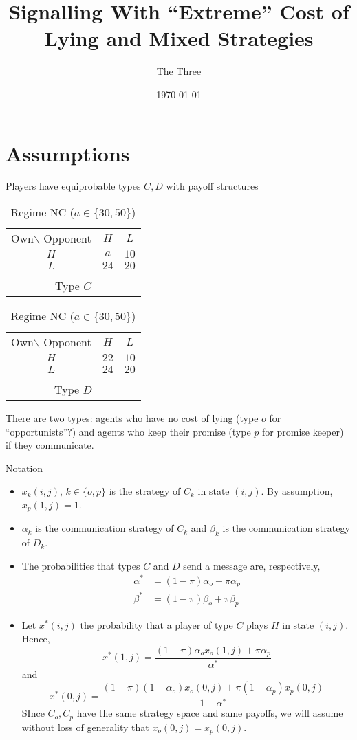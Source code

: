 \documentclass[12pt]{article}
\begin{document}
 
\title{Signalling With ``Extreme'' Cost of Lying and Mixed Strategies} 
\author{The Three}
\date{\today} 
\maketitle

\tableofcontents

\pagebreak
\section{Assumptions}
Players have equiprobable types $C,D$ with payoff structures
\begin{table}
	[!htbp] \centering 
	\begin{tabular}
		{c c c} {\small{Own$\backslash$} Opponent} & $H$ & $L$ \\
		\cline{2-3} $H$ & $a$& $10$\\
		\cline{2-3} $L$ & $24$& $20$ \\
		\cline{2-3}\\
		\multicolumn{3}{c}{Type $C$} 
	\end{tabular}
	\hspace{5em} 
	\begin{tabular}
		{c c c} {\small{Own$\backslash$} Opponent} & $H$ & $L$ \\
		\cline{2-3} $H$ & $22$& $10$\\
		\cline{2-3} $L$ & $24$& $20$ \\
		\cline{2-3}\\
		\multicolumn{3}{c}{Type $D$} 
	\end{tabular}
	\caption{Regime NC ($a\in\{30,50\}$)} 
\label{tbl:NC} 
\end{table}

There are two types: agents who have no cost of lying (type $o$ for ``opportunists''?) and agents who keep their promise (type $p$ for promise keeper) if they communicate.

Notation
\begin{itemize}
	\item $x_k(i,j)$, $k\in\{o,p\}$ is the strategy of $C_k$ in state $(i,j)$. By assumption, $x_p(1,j)=1$.
	\item $\alpha_k$ is the communication strategy of $C_k$ and $\beta_k$ is the communication strategy of $D_k$.
	\item The probabilities that types $C$ and $D$ send a message are, respectively,
	\begin{align*}
		\alpha^* &=(1-\pi)\alpha_o+\pi\alpha_p\\
		\beta^* &=(1-\pi)\beta_o+\pi\beta_p
	\end{align*}
	\item Let $x^*(i,j)$ the probability that a player of type $C$ plays $H$ in state $(i,j)$. Hence,
	\[
x^*(1,j)=\frac{(1-\pi)\alpha_o x_o(1,j)+\pi\alpha_p}{\alpha^*}
\]
and 
\[
x^*(0,j)=\frac{(1-\pi)(1-\alpha_o) x_o(0,j)+\pi(1-\alpha_p)x_p(0,j)}{1-\alpha^*}
\]
SInce $C_o,C_p$ have the same strategy space and same payoffs, we will assume without loss of generality that $x_o(0,j)=x_p(0,j)$.

\end{itemize}
\end{document}
